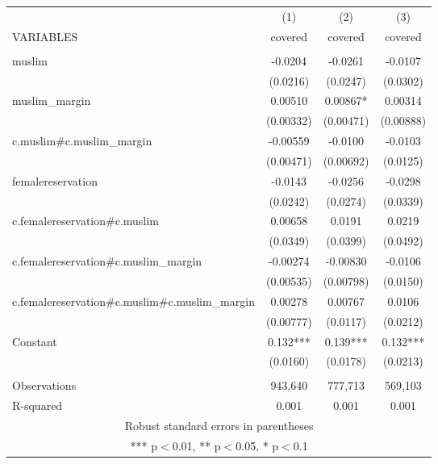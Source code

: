 \documentclass[]{article}
\begin{document}
\begin{tabular}{lccc} \hline
 & (1) & (2) & (3) \\
VARIABLES & covered & covered & covered \\ \hline
 &  &  &  \\
muslim & -0.0204 & -0.0261 & -0.0107 \\
 & (0.0216) & (0.0247) & (0.0302) \\
muslim\_margin & 0.00510 & 0.00867* & 0.00314 \\
 & (0.00332) & (0.00471) & (0.00888) \\
c.muslim\#c.muslim\_margin & -0.00559 & -0.0100 & -0.0103 \\
 & (0.00471) & (0.00692) & (0.0125) \\
femalereservation & -0.0143 & -0.0256 & -0.0298 \\
 & (0.0242) & (0.0274) & (0.0339) \\
c.femalereservation\#c.muslim & 0.00658 & 0.0191 & 0.0219 \\
 & (0.0349) & (0.0399) & (0.0492) \\
c.femalereservation\#c.muslim\_margin & -0.00274 & -0.00830 & -0.0106 \\
 & (0.00535) & (0.00798) & (0.0150) \\
c.femalereservation\#c.muslim\#c.muslim\_margin & 0.00278 & 0.00767 & 0.0106 \\
 & (0.00777) & (0.0117) & (0.0212) \\
Constant & 0.132*** & 0.139*** & 0.132*** \\
 & (0.0160) & (0.0178) & (0.0213) \\
 &  &  &  \\
Observations & 943,640 & 777,713 & 569,103 \\
 R-squared & 0.001 & 0.001 & 0.001 \\ \hline
\multicolumn{4}{c}{ Robust standard errors in parentheses} \\
\multicolumn{4}{c}{ *** p$<$0.01, ** p$<$0.05, * p$<$0.1} \\
\end{tabular}
\end{document}
